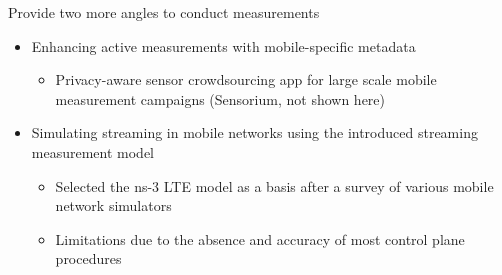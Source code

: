 \documentclass{beamer}
\begin{document}
\begin{frame}
	\pause
	Provide two more angles to conduct measurements
		\begin{itemize}
			\item Enhancing active measurements with mobile-specific metadata
			\begin{itemize}
				\item Privacy-aware sensor crowdsourcing app for large scale mobile measurement campaigns (Sensorium, not shown here)
			\end{itemize}
			\item Simulating streaming in mobile networks using the introduced streaming measurement model
			\begin{itemize}
				\item Selected the ns-3 LTE model as a basis after a survey of various mobile network simulators
				\item Limitations due to the absence and accuracy of most control plane procedures
			\end{itemize}
		\end{itemize}
\end{frame}











\end{document}
